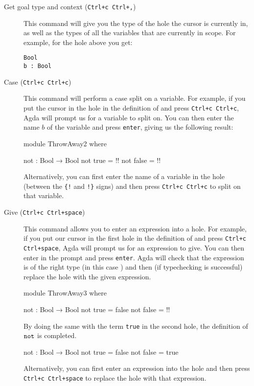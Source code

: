 \documentclass[a4paper,UKenglish]{tufte-handout}
\theoremstyle{definition}
\newcommand\var[1]{\mathit{#1}}
\newcommand\fun[1]{{\AgdaFunction{#1}}}
\newcommand\data[1]{{\AgdaFunction{#1}}}
\newcommand\con[1]{{\AgdaInductiveConstructor{#1}}}
\begin{document}
\begin{description}
\item[Get goal type and context (\texttt{Ctrl+c Ctrl+,})] This command
  will give you the type of the hole the cursor is currently in, as
  well as the types of all the variables that are currently in
  scope. For example, for the hole above you get:
\begin{verbatim}
Bool
b : Bool
\end{verbatim}
\item[Case (\texttt{Ctrl+c Ctrl+c})] This command will perform a case
  split on a variable. For example, if you put the cursor in the hole
  in the definition of \fun{not} and press \texttt{Ctrl+c Ctrl+c},
  Agda will prompt us for a variable to split on. You can then
  enter the name $\var{b}$ of the variable and press \texttt{enter},
  giving us the following result:
\begin{code}[hide]
module ThrowAway2 where
\end{code}
\begin{code}[number]
  not : Bool → Bool
  not true   = {!!}
  not false  = {!!}
\end{code}
  Alternatively, you can first enter the name of a variable in
  the hole (between the \texttt{\{!} and \texttt{!\}} signs)
  and then press \texttt{Ctrl+c Ctrl+c} to split on that variable.
\item[Give (\texttt{Ctrl+c Ctrl+space})] This command allows
  you to enter an expression into a hole. For example, if you put
  our cursor in the first hole in the definition of \fun{not}
  and press \texttt{Ctrl+c Ctrl+space}, Agda will prompt us
  for an expression to give. You can then enter \con{false} in
  the prompt and press \texttt{enter}. Agda will check that the
  expression is of the right type (in this case \data{Bool}) and
  then (if typechecking is successful) replace the hole with the given
  expression.
  \begin{code}[hide]
module ThrowAway3 where
\end{code}%
\begin{code}[number]
  not  : Bool → Bool
  not  true   = false
  not  false  = {!!}
\end{code}
  By doing the same with the term \texttt{true} in the second hole,
  the definition of $\fun{not}$ is completed.
\begin{code}[hide]
not  : Bool → Bool
not  true   = false
not  false  = true
\end{code}
  Alternatively, you can first enter an expression into
  the hole and then
  press \texttt{Ctrl+c Ctrl+space} to replace the hole with that expression.


\end{description}
\end{document}
